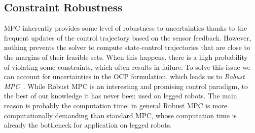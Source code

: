 \subsection{Constraint Robustness}
MPC inherently provides some level of robustness to uncertainties thanks to the frequent updates of the control trajectory based on the sensor feedback.
However, nothing prevents the solver to compute state-control trajectories that are close to the margins of their feasible sets.
When this happens, there is a high probability of violating some constraints, which often results in failure.
To solve this issue we can account for uncertainties in the OCP formulation, which leads us to \emph{Robust MPC}~\cite{Bemporad1999}.
While Robust MPC is an interesting and promising control paradigm, to the best of our knowledge it has never been used on legged robots.
The main reason is probably the computation time: in general Robust MPC is more computationally demanding than standard MPC, whose computation time is already the bottleneck for application on legged robots.

